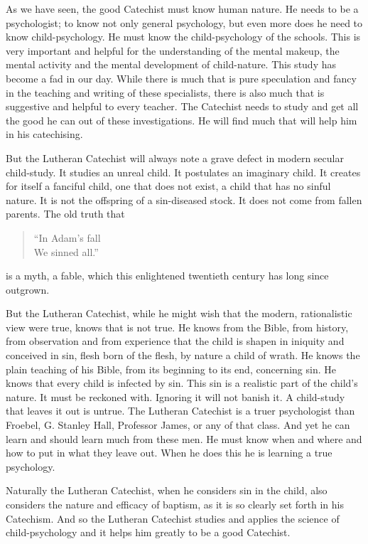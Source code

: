  As we have seen, the good Catechist must know human nature. He needs to be a psychologist; to know not only general psychology, but even more does he need to know child-psychology. He must know the child-psychology of the schools. This is very important and helpful for the understanding of the mental makeup, the mental activity and the mental development of child-nature. This study has become a fad in our day. While there is much that is
pure speculation and fancy in the teaching and writing of these specialists, there is also much that is suggestive and helpful to every teacher. The Catechist needs to study and get all the good he can out of these investigations. He will find much that will help him in his catechising.

 But the Lutheran Catechist will always note a grave defect in modern secular child-study. It studies an unreal child. It postulates an imaginary child. It creates for itself a fanciful child, one that does not exist, a child that has no sinful nature. It is not the offspring of a sin-diseased stock. It does not come from fallen parents. The old truth that

\begin{quote}“In Adam’s fall\\We sinned all.”\end{quote}

is a myth, a fable, which this enlightened twentieth century has long since outgrown.

 But the Lutheran Catechist, while he might wish that the modern, rationalistic view were true, knows that is not true. He knows from the Bible, from history, from observation and from experience that the child is shapen in iniquity and conceived in sin, flesh born of the flesh, by nature a child of wrath. He knows the plain teaching of his Bible, from its beginning to its end, concerning sin. He knows that every child is infected by sin. This sin is a realistic part of the child’s nature. It must be
reckoned with. Ignoring it will not banish it. A child-study that leaves it out is untrue. The Lutheran Catechist is a truer psychologist than Froebel, G. Stanley Hall, Professor James, or any of that class. And yet he can learn and should learn much from these men. He must know when and where and how to put in what they leave out. When he does this he is learning a true psychology.

Naturally the Lutheran Catechist, when he considers sin in the child, also considers the nature and efficacy of baptism, as it is so clearly set forth in his Catechism. And so the Lutheran Catechist studies and applies the science of child-psychology and it helps him greatly to be a good Catechist.

